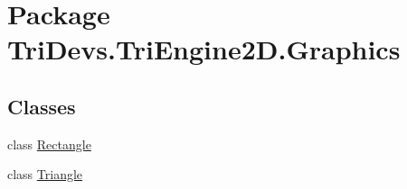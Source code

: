 \hypertarget{namespace_tri_devs_1_1_tri_engine2_d_1_1_graphics}{\section{Package Tri\-Devs.\-Tri\-Engine2\-D.\-Graphics}
\label{namespace_tri_devs_1_1_tri_engine2_d_1_1_graphics}
}
\subsection*{Classes}
\begin{DoxyCompactItemize}
\item 
class \hyperlink{class_tri_devs_1_1_tri_engine2_d_1_1_graphics_1_1_rectangle}{Rectangle}
\item 
class \hyperlink{class_tri_devs_1_1_tri_engine2_d_1_1_graphics_1_1_triangle}{Triangle}
\end{DoxyCompactItemize}

